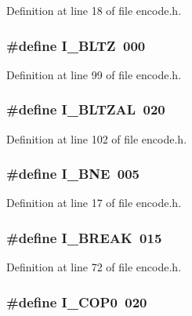 Definition at line 18 of file encode.\+h.

\subsubsection[{I\+\_\+\+B\+L\+TZ}]{\setlength{\rightskip}{0pt plus 5cm}\#define I\+\_\+\+B\+L\+TZ~000}\label{encode_8h_a2986246271e453acd25e3e0ad7ad40d2}


Definition at line 99 of file encode.\+h.

\subsubsection[{I\+\_\+\+B\+L\+T\+Z\+AL}]{\setlength{\rightskip}{0pt plus 5cm}\#define I\+\_\+\+B\+L\+T\+Z\+AL~020}\label{encode_8h_a126be1d611dc2fadb6cc553126f76f44}


Definition at line 102 of file encode.\+h.

\subsubsection[{I\+\_\+\+B\+NE}]{\setlength{\rightskip}{0pt plus 5cm}\#define I\+\_\+\+B\+NE~005}\label{encode_8h_a53441e8d902674b775460c9ad56cd1f5}


Definition at line 17 of file encode.\+h.

\subsubsection[{I\+\_\+\+B\+R\+E\+AK}]{\setlength{\rightskip}{0pt plus 5cm}\#define I\+\_\+\+B\+R\+E\+AK~015}\label{encode_8h_adbd5495a5a7584ce408afc77053a1a6e}


Definition at line 72 of file encode.\+h.

\subsubsection[{I\+\_\+\+C\+O\+P0}]{\setlength{\rightskip}{0pt plus 5cm}\#define I\+\_\+\+C\+O\+P0~020}\label{encode_8h_a2d6a8de45717404000e3046d50595a06}


